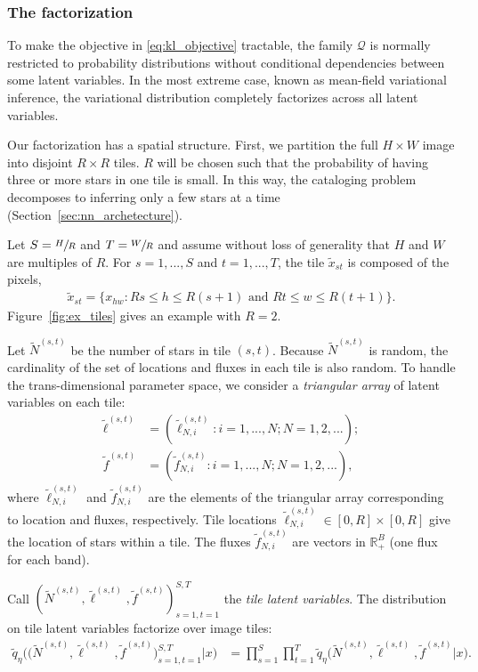 \subsubsection{The factorization}
\label{sec:factorization}
To make the objective in \eqref{eq:kl_objective} tractable, the family $\mathcal{Q}$ is normally restricted to probability distributions 
without conditional dependencies between some latent variables. In the most extreme case, known as mean-field variational inference, the variational distribution completely factorizes across all latent variables. 

Our factorization has a spatial structure. 
First, we partition the full $H \times W$ image into disjoint $R \times R$ tiles. 
$R$ will be chosen such that the probability of having three or more stars in one tile is small. 
In this way, the cataloging problem decomposes to inferring only a few stars at a time (Section~\ref{sec:nn_archetecture}). 


Let $S = \sfrac{H}{R}$ and $T = \sfrac{W}{R}$ and assume without loss of generality that $H$ and $W$ are multiples of $R$.
For $s = 1, ..., S$ and $t = 1, ..., T$,
the tile $\tilde x_{st}$ is composed of the pixels,
\begin{align}
    \tilde x_{st} = \{x_{hw} : Rs \leq h \leq R(s+1) \text{ and } Rt \leq w \leq R(t+1)\}.
    \label{eq:tiles}
\end{align}
Figure~\ref{fig:ex_tiles} gives an example with $R = 2$. 

Let $\tilde N^{(s, t)}$ be the number of stars in tile $(s,t)$.
Because $\tilde N^{(s, t)}$ is random, 
the cardinality of the set of locations and fluxes in each tile
is also random. 
To handle the trans-dimensional parameter space, 
we consider a {\itshape triangular array} of latent variables
on each tile:
\begin{align}
    \tilde\ell^{(s, t)} &= (\tilde\ell_{N, i}^{(s, t)} : i = 1, ..., N; N = 1, 2, ...); \\
    \tilde f^{(s, t)} &= (\tilde f_{N, i}^{(s, t)} : i = 1, ..., N; N = 1, 2, ...),
\end{align}
where $\tilde\ell_{N, i}^{(s, t)}$ and $\tilde f_{N, i}^{(s, t)}$ are the elements of the triangular array corresponding to location and fluxes, respectively. 
Tile locations $\tilde\ell_{N, i}^{(s, t)} \in [0, R]\times[0, R]$ give the location of stars within a tile. The fluxes $\tilde f_{N, i}^{(s, t)}$ are vectors in $\mathbb{R}^B_+$ (one flux for each band). 

Call $(\tilde N^{(s, t)}, \tilde \ell^{(s, t)}, \tilde f^{(s, t)})_{s=1,t=1}^{S,T}$ the {\itshape tile latent variables}. The distribution on tile latent variables factorize over image tiles:
\begin{align}
    \tilde q_\eta\big( \big(\tilde N^{(s, t)}, \tilde \ell^{(s, t)}, \tilde f^{(s, t)}\big)_{s=1, t = 1}^{S, T}|x\big) 
    &=
    \prod_{s = 1}^S \prod_{t=1}^T
    \tilde q_\eta\big(\tilde N^{(s, t)}, \tilde \ell^{(s, t)}, \tilde f^{(s, t)} | x\big).
    \label{eq:factorize_patches}
\end{align}

